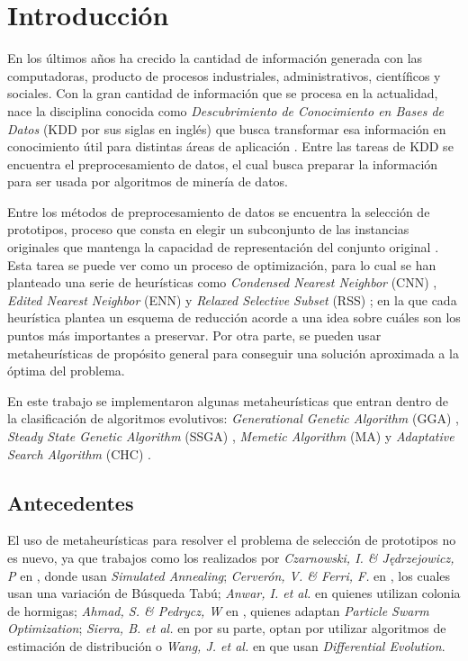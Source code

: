 \chapter*{Introducción}
\label{intro}

En los últimos años ha crecido la cantidad de información generada con las computadoras, producto de procesos industriales, administrativos, científicos y sociales. Con la gran cantidad de información que se procesa en la actualidad, nace la disciplina conocida como \emph{Descubrimiento de Conocimiento en Bases de Datos} (KDD por sus siglas en inglés) que busca transformar esa información en conocimiento útil para distintas áreas de aplicación \cite{han2011data}. Entre las tareas de KDD se encuentra el preprocesamiento de datos, el cual busca preparar la información para ser usada por algoritmos de minería de datos. 

Entre los métodos de preprocesamiento de datos se encuentra la selección de prototipos, proceso que consta en elegir un subconjunto de las instancias originales que mantenga la capacidad de representación del conjunto original \cite{garcia2016data}. Esta tarea se puede ver como un proceso de optimización, para lo cual se han planteado una serie de heurísticas como \emph{Condensed Nearest Neighbor} (CNN) \cite{hart1968condensed}, \emph{Edited Nearest Neighbor} (ENN) \cite{wilson1972asymptotic} y \emph{Relaxed Selective Subset} (RSS) \cite{floresnearest}; en la que cada heurística plantea un esquema de reducción acorde a una idea sobre cuáles son los puntos más importantes a preservar. Por otra parte, se pueden usar metaheurísticas de propósito general para conseguir una solución aproximada a la óptima del problema. 

En este trabajo se implementaron algunas metaheurísticas que entran dentro de la clasificación de algoritmos evolutivos: \emph{Generational Genetic Algorithm} (GGA) \cite{holland1975adaptation}, \emph{Steady State Genetic Algorithm} (SSGA) \cite{talbi2009metaheuristics}, \emph{Memetic Algorithm} (MA) \cite{neri2012memetic} y \emph{Adaptative Search Algorithm} (CHC) \cite{eshelman1991chc}.

\section{Antecedentes}

El uso de metaheurísticas para resolver el problema de selección de prototipos no es nuevo, ya que trabajos como los realizados por \emph{Czarnowski, I. \& J{\k{e}}drzejowicz, P} en \cite{czarnowski2011application}, donde usan \emph{Simulated Annealing}; \emph{Cerverón, V. \& Ferri, F.} en \cite{cerveron2001another}, los cuales usan una variación de Búsqueda Tabú; \emph{Anwar, I. et al.} en \cite{anwar2015instance,anwar2015adr} quienes utilizan colonia de hormigas; \emph{Ahmad, S. \& Pedrycz, W} en \cite{ahmad2011feature}, quienes adaptan \emph{Particle Swarm Optimization}; \emph{Sierra, B. et al.} en \cite{sierra2001prototype} por su parte, optan por utilizar algoritmos de estimación de distribución o \emph{Wang, J. et al.} en \cite{wang2016differential} que usan \emph{Differential Evolution}. 


